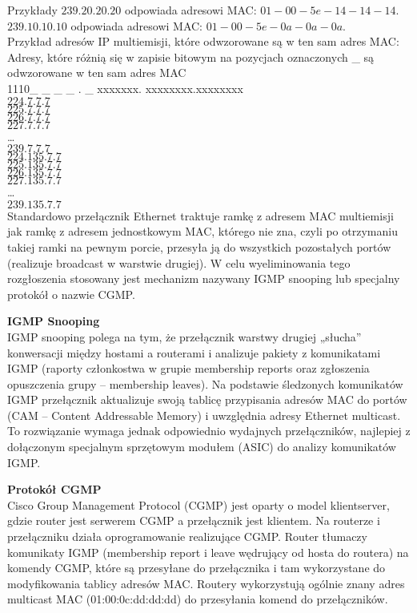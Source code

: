 \documentclass[../main.tex]{subfiles}
\begin{document}
    Przykłady
    $239.20.20.20$ odpowiada adresowi MAC: $01-00-5e-14-14-14$.\\
    $239.10.10.10$ odpowiada adresowi MAC: $01-00-5e-0a-0a-0a$.\\
    Przykład adresów IP multiemisji, które odwzorowane są w ten sam adres MAC:
    Adresy, które różnią się w zapisie bitowym na pozycjach oznaczonych \_ są odwzorowane w
    ten sam adres MAC\\
    1110\_ \_ \_ \_ . \_ xxxxxxx. xxxxxxxx.xxxxxxxx\\
    $224.7.7.7$\\
    $225.7.7.7$\\
    $226.7.7.7$\\
    $227.7.7.7$\\
    …\\
    $239.7.7.7$\\
    $224.135.7.7$\\
    $225.135.7.7$\\
    $226.135.7.7$\\
    $227.135.7.7$\\
    …\\
    $239.135.7.7$\\

    Standardowo przełącznik Ethernet traktuje ramkę z adresem MAC multiemisji jak ramkę z
    adresem jednostkowym MAC, którego nie zna, czyli po otrzymaniu takiej ramki na
    pewnym porcie, przesyła ją do wszystkich pozostałych portów (realizuje broadcast w
    warstwie drugiej). W celu wyeliminowania tego rozgłoszenia stosowany jest mechanizm
    nazywany IGMP snooping lub specjalny protokół o nazwie CGMP.


    \textbf{IGMP Snooping}\\
    IGMP snooping polega na tym, że przełącznik warstwy drugiej „słucha” konwersacji między
    hostami a routerami i analizuje pakiety z komunikatami IGMP (raporty członkostwa w grupie
    membership reports oraz zgłoszenia opuszczenia grupy – membership leaves). Na podstawie
    śledzonych komunikatów IGMP przełącznik aktualizuje swoją tablicę przypisania adresów
    MAC do portów (CAM – Content Addressable Memory) i uwzględnia adresy Ethernet
    multicast.
    To rozwiązanie wymaga jednak odpowiednio wydajnych przełączników, najlepiej z
    dołączonym specjalnym sprzętowym modułem (ASIC) do analizy komunikatów IGMP.


    \textbf{Protokół CGMP}\\
    Cisco Group Management Protocol (CGMP) jest oparty o model klientserver, gdzie router jest serwerem CGMP a przełącznik jest klientem. Na routerze i
    przełączniku działa oprogramowanie realizujące CGMP. Router tłumaczy komunikaty IGMP
    (membership report i leave wędrujący od hosta do routera) na komendy CGMP, które są
    przesyłane do przełącznika i tam wykorzystane do modyfikowania tablicy adresów MAC.
    Routery wykorzystują ogólnie znany adres multicast MAC (01:00:0c:dd:dd:dd) do przesyłania
    komend do przełączników.
\end{document}
